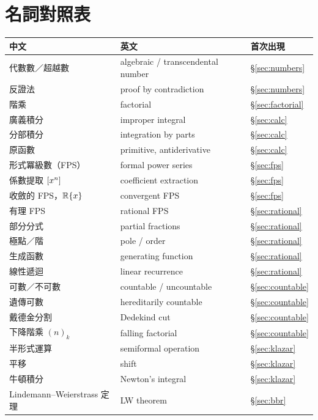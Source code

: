 \section*{名詞對照表}

\begin{center}
\small
\begin{tabular}{@{}lll@{}}
\toprule
中文 & 英文 & 首次出現 \\
\midrule
代數數／超越數 & algebraic / transcendental number & §\ref{sec:numbers} \\
反證法 & proof by contradiction & §\ref{sec:numbers} \\
階乘 & factorial & §\ref{sec:factorial} \\
廣義積分 & improper integral & §\ref{sec:calc} \\
分部積分 & integration by parts & §\ref{sec:calc} \\
原函數 & primitive, antiderivative & §\ref{sec:calc} \\
形式冪級數（FPS） & formal power series & §\ref{sec:fps} \\
係數提取 $[x^{n}]\,$ & coefficient extraction & §\ref{sec:fps} \\
收斂的 FPS，$\mathbb{R}\{x\}$ & convergent FPS & §\ref{sec:fps} \\
有理 FPS & rational FPS & §\ref{sec:rational} \\
部分分式 & partial fractions & §\ref{sec:rational} \\
極點／階 & pole / order & §\ref{sec:rational} \\
生成函數 & generating function & §\ref{sec:rational} \\
線性遞迴 & linear recurrence & §\ref{sec:rational} \\
可數／不可數 & countable / uncountable & §\ref{sec:countable} \\
遺傳可數 & hereditarily countable & §\ref{sec:countable} \\
戴德金分割 & Dedekind cut & §\ref{sec:countable} \\
下降階乘 $(n)_k$ & falling factorial & §\ref{sec:countable} \\
半形式運算 & semiformal operation & §\ref{sec:klazar} \\
平移 & shift & §\ref{sec:klazar} \\
牛頓積分 & Newton's integral & §\ref{sec:klazar} \\
Lindemann--Weierstrass 定理 & LW theorem & §\ref{sec:bbr} \\
\bottomrule
\end{tabular}
\end{center}
